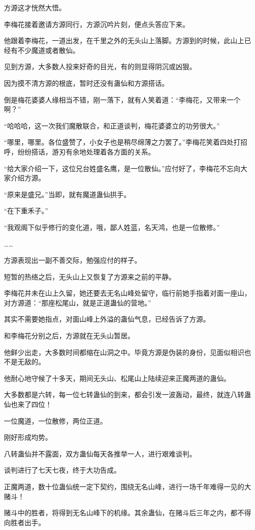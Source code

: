 \begin{this_body}
方源这才恍然大悟。

李梅花接着邀请方源同行，方源沉吟片刻，便点头答应下来。

他跟着李梅花，一道出发，在千里之外的无头山上落脚。方源到的时候，此山上已经有不少魔道或者散仙。

见到方源，大多数人投来好奇的目光，有的则显得阴沉或凶狠。

因为摸不清方源的根底，暂时还没有蛊仙和方源搭话。

倒是梅花婆婆人缘相当不错，刚一落下，就有人笑着道：“李梅花，又带来一个啊？”

“哈哈哈，这一次我们魔散联合，和正道谈判，梅花婆婆立的功劳很大。”

“哪里，哪里。各位盛赞了，小女子也是稍尽绵薄之力罢了。”李梅花笑着四处打招呼，纷纷搭话，游刃有余地处理着各方面的关系。

“给大家介绍一下，这位兄台姓盛名鹰，是一位散仙。”应付好了，李梅花不忘向大家介绍方源。

“原来是盛兄。”当即，就有魔道蛊仙拱手。

“在下重禾子。”

“我观阁下似乎修行的变化道，哦，鄙人姓蓝，名天鸿，也是一位散修。”

……

方源表现出一副不善交际，勉强应付的样子。

短暂的热络之后，无头山上又恢复了方源来之前的平静。

李梅花并未在山上久留，她还要去无名山峰处留守，临行前她手指着对面一座山，对方源道：“那座松尾山，就是正道蛊仙的营地。”

其实不需要她指点，对面山峰上外溢的蛊仙气息，已经告诉了方源。

和李梅花分别之后，方源就在无头山暂居。

他鲜少出走，大多数时间都缩在山洞之中。毕竟方源是伪装的身份，见面似相识也不是无敌的。

他耐心地守候了十多天，期间无头山、松尾山上陆续迎来正魔两道的蛊仙。

大多数都是六转，每一位七转蛊仙的到来，都会引发一波轰动，最终，就连八转蛊仙也来了四位！

一位魔道，一位散修，两位正道。

刚好形成均势。

八转蛊仙并不露面，双方蛊仙每天各推举一人，进行艰难谈判。

谈判进行了七天七夜，终于大功告成。

正魔两道，数十位蛊仙统一定下契约，围绕无名山峰，进行一场千年难得一见的大赌斗！

赌斗中的胜者，将得到无名山峰下的机缘。其余蛊仙，在赌斗后三年之内，都不得向胜者出手。

\end{this_body}

